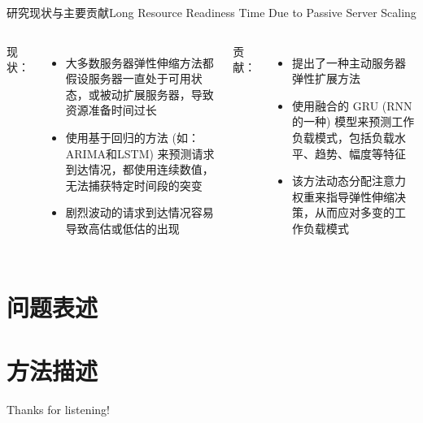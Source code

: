 \documentclass[aspectratio=169]{beamer}
\begin{document}
\begin{frame}{研究现状与主要贡献}{Long Resource Readiness Time Due to Passive Server Scaling}
  \begin{columns}
    现状：
    \begin{itemize}
      \item 大多数服务器弹性伸缩方法都假设服务器一直处于可用状态，或被动扩展服务器，导致资源准备时间过长
      \item 使用基于回归的方法 (如：ARIMA和LSTM) 来预测请求到达情况，都使用连续数值，无法捕获特定时间段的突变
      \item 剧烈波动的请求到达情况容易导致高估或低估的出现
    \end{itemize}

    贡献：
    \begin{itemize}
      \item 提出了一种主动服务器弹性扩展方法
      \item 使用融合的 GRU (RNN的一种) 模型来预测工作负载模式，包括负载水平、趋势、幅度等特征
      \item 该方法动态分配注意力权重来指导弹性伸缩决策，从而应对多变的工作负载模式
    \end{itemize}
  \end{columns}
\end{frame}

\section{问题表述}

\section{方法描述}

\begin{frame}

  \centering
  \Huge
  Thanks for listening!

\end{frame}
\end{document}
